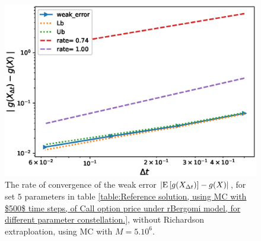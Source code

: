 \begin{figure}[!htb]
		\centering
		\includegraphics[width=0.4\linewidth]{./figures/rBergomi_weak_error_rates/without_richardson/H_002/weak_convergence_order_Bergomi_H_002_K_12_M_3_10_6_CI_relative}	
	\caption{The rate of convergence of the weak error $\left\lvert\mathrm{E}\left[g(X_{\Delta t})\right]-g(X)\right\rvert$, for set $5$ parameters in table \ref{table:Reference solution, using MC with $500$ time steps, of Call option price under rBergomi model, for different parameter constellation.}, without Richardson extraploation, using MC with $M=5.10^6$.}
	\label{fig:Weak_rate_H_002_without_rich_K_12}
\end{figure}


\FloatBarrier


